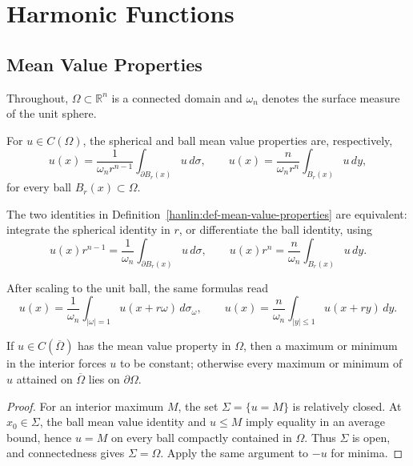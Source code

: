 \chapter{Harmonic Functions}

\section{Mean Value Properties}

Throughout, $\Omega\subset\mathbb R^n$ is a connected domain and $\omega_n$
denotes the surface measure of the unit sphere.

\begin{definition}\label{hanlin:def-mean-value-properties}


For $u\in C(\Omega)$, the spherical and ball mean value properties are,
respectively,
\[
 u(x)=\frac{1}{\omega_n r^{n-1}}\int_{\partial B_r(x)}u\,d\sigma,
 \qquad
 u(x)=\frac{n}{\omega_n r^n}\int_{B_r(x)}u\,dy,
\]
for every ball $B_r(x)\subset\Omega$.
\end{definition}

\begin{remark}\label{hanlin:remark-mean-value-equivalent}
The two identities in Definition~\ref{hanlin:def-mean-value-properties} are
equivalent: integrate the spherical identity in $r$, or differentiate the ball
identity, using
\[
u(x)r^{n-1}=\frac1{\omega_n}\int_{\partial B_r(x)}u\,d\sigma,
\qquad
u(x)r^n=\frac n{\omega_n}\int_{B_r(x)}u\,dy.
\]
\end{remark}

\begin{remark}\label{hanlin:remark-mean-value-equivalent-forms}
After scaling to the unit ball, the same formulas read
\[
u(x)=\frac1{\omega_n}\int_{|\omega|=1}u(x+r\omega)\,d\sigma_\omega,
\qquad
u(x)=\frac n{\omega_n}\int_{|y|\le1}u(x+ry)\,dy.
\]
\end{remark}

\begin{theorem}\label{hanlin:thm-mean-value-max}


If $u\in C(\overline\Omega)$ has the mean value property in $\Omega$, then a
maximum or minimum in the interior forces $u$ to be constant; otherwise every
maximum or minimum of $u$ attained on $\overline\Omega$ lies on $\partial\Omega$.
\end{theorem}
\begin{proof}
\sketch For an interior maximum $M$, the set $\Sigma=\{u=M\}$ is relatively
closed. At $x_0\in\Sigma$, the ball mean value identity and $u\le M$ imply
equality in an average bound, hence $u=M$ on every ball compactly contained in
$\Omega$. Thus $\Sigma$ is open, and connectedness gives $\Sigma=\Omega$.
Apply the same argument to $-u$ for minima.
\end{proof}

